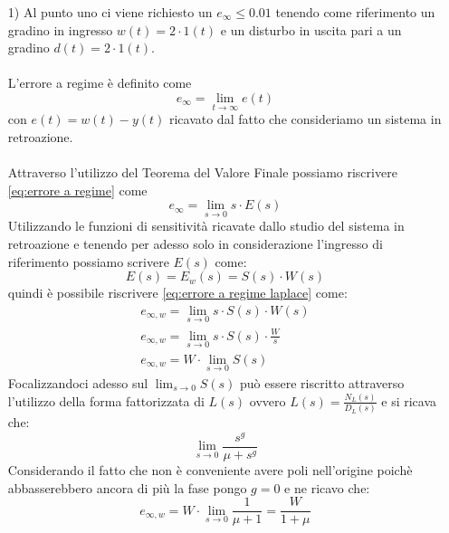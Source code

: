 \documentclass[a4paper, 11pt]{article}
\begin{document}
\begin{itemize}
    \item[1)] Al punto uno ci viene richiesto un $e_\infty \le 0.01$ tenendo come riferimento un gradino in ingresso $w(t) = 2 \cdot 1(t)$ e un disturbo in uscita pari a un gradino $d(t) = 2 \cdot 1(t)$.\\\\
    L'errore a regime è definito come
    \begin{equation}\label{eq:errore a regime}
        e_\infty = \lim_{t \to \infty} e(t)
    \end{equation}
    con $e(t) = w(t) - y(t)$ ricavato dal fatto che consideriamo un sistema in retroazione.\\\\
    Attraverso l'utilizzo del Teorema del Valore Finale possiamo riscrivere \eqref{eq:errore a regime} come
    \begin{equation}\label{eq:errore a regime laplace}
        e_\infty = \lim_{s \to 0} s \cdot E(s)
    \end{equation}
    Utilizzando le funzioni di sensitività ricavate dallo studio del sistema in retroazione e tenendo per adesso solo in considerazione l'ingresso di riferimento possiamo scrivere $E(s)$ come:
    \begin{equation*}
        E(s) = E_w(s) = S(s) \cdot W(s) 
    \end{equation*}
    quindi è possibile riscrivere \eqref{eq:errore a regime laplace} come:
    \begin{align*}
        e_{\infty,w} = \lim_{s \to 0} s \cdot S(s) \cdot W(s) 
        \\
        e_{\infty,w} = \lim_{s \to 0} s \cdot S(s) \cdot \frac{W}{s}
        \\
        e_{\infty,w} = W \cdot \lim_{s \to 0} S(s)
    \end{align*}
    Focalizzandoci adesso sul $\lim_{s \to 0} S(s)$ può essere riscritto attraverso l'utilizzo della forma fattorizzata di $L(s)$ ovvero $L(s) = \frac{N_L(s)}{D_L(s)}$ e si ricava che:
    \begin{equation*}
        \lim_{s \to 0} \frac{s^g}{\mu + s^g}
    \end{equation*}
    Considerando il fatto che non è conveniente avere poli nell'origine poichè abbasserebbero ancora di più la fase pongo $g = 0$ e ne ricavo che:
    \begin{equation*}
        e_{\infty,w}= W \cdot \lim_{s \to 0} \frac{1}{\mu + 1} = \frac{W}{1 + \mu}
    \end{equation*}

\end{itemize}
\end{document}
